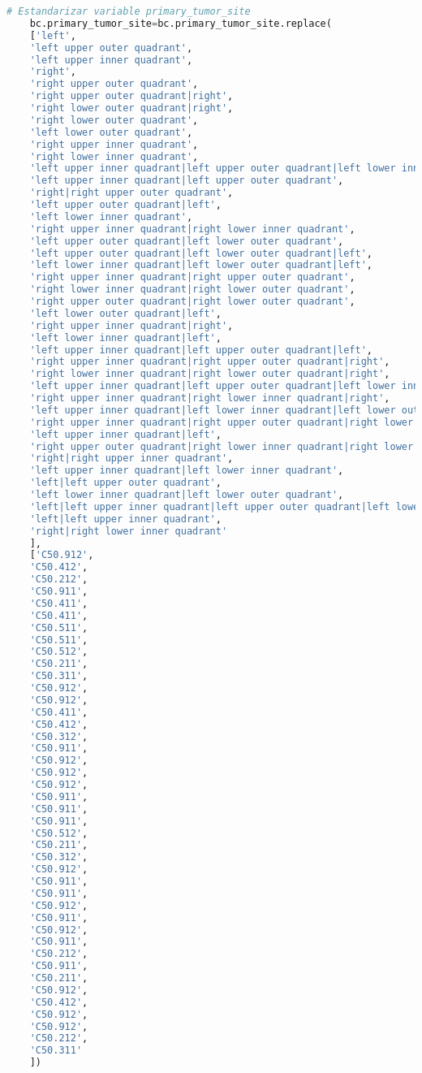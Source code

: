 \begin{lstlisting}[basicstyle=\scriptsize,language=Python, label=estandarizacion, caption=Estandarización de datos genómicos en Python.]
	# Estandarizar variable primary_tumor_site
	bc.primary_tumor_site=bc.primary_tumor_site.replace(
	['left',
	'left upper outer quadrant',
	'left upper inner quadrant',
	'right',
	'right upper outer quadrant',
	'right upper outer quadrant|right',
	'right lower outer quadrant|right',
	'right lower outer quadrant',
	'left lower outer quadrant',
	'right upper inner quadrant',
	'right lower inner quadrant',
	'left upper inner quadrant|left upper outer quadrant|left lower inner quadrant|left lower outer quadrant',
	'left upper inner quadrant|left upper outer quadrant',
	'right|right upper outer quadrant',
	'left upper outer quadrant|left',
	'left lower inner quadrant',
	'right upper inner quadrant|right lower inner quadrant',
	'left upper outer quadrant|left lower outer quadrant',
	'left upper outer quadrant|left lower outer quadrant|left',
	'left lower inner quadrant|left lower outer quadrant|left',
	'right upper inner quadrant|right upper outer quadrant',
	'right lower inner quadrant|right lower outer quadrant',
	'right upper outer quadrant|right lower outer quadrant',
	'left lower outer quadrant|left',
	'right upper inner quadrant|right',
	'left lower inner quadrant|left',
	'left upper inner quadrant|left upper outer quadrant|left',
	'right upper inner quadrant|right upper outer quadrant|right',
	'right lower inner quadrant|right lower outer quadrant|right',
	'left upper inner quadrant|left upper outer quadrant|left lower inner quadrant|left lower outer quadrant|left',
	'right upper inner quadrant|right lower inner quadrant|right',
	'left upper inner quadrant|left lower inner quadrant|left lower outer quadrant|left',
	'right upper inner quadrant|right upper outer quadrant|right lower inner quadrant|right lower outer quadrant|right',
	'left upper inner quadrant|left',
	'right upper outer quadrant|right lower inner quadrant|right lower outer quadrant',
	'right|right upper inner quadrant',
	'left upper inner quadrant|left lower inner quadrant',
	'left|left upper outer quadrant',
	'left lower inner quadrant|left lower outer quadrant',
	'left|left upper inner quadrant|left upper outer quadrant|left lower inner quadrant|left lower outer quadrant',
	'left|left upper inner quadrant',
	'right|right lower inner quadrant'
	],
	['C50.912',
	'C50.412',
	'C50.212',
	'C50.911',
	'C50.411',
	'C50.411',
	'C50.511',
	'C50.511',
	'C50.512',
	'C50.211',
	'C50.311',
	'C50.912',
	'C50.912',
	'C50.411',
	'C50.412',
	'C50.312',
	'C50.911',
	'C50.912',
	'C50.912',
	'C50.912',
	'C50.911',
	'C50.911',
	'C50.911',
	'C50.512',
	'C50.211',
	'C50.312',
	'C50.912',
	'C50.911',
	'C50.911',
	'C50.912',
	'C50.911',
	'C50.912',
	'C50.911',
	'C50.212',
	'C50.911',
	'C50.211',
	'C50.912',
	'C50.412',
	'C50.912',
	'C50.912',
	'C50.212',
	'C50.311'
	])
	
\end{lstlisting}


